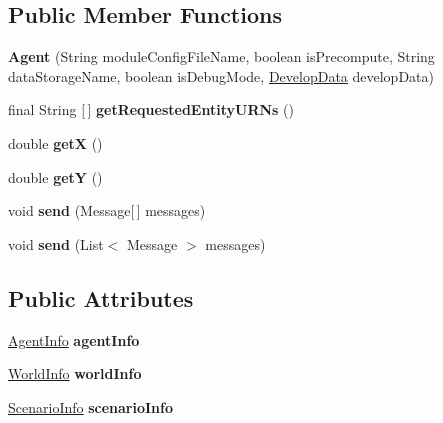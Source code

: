 \subsection*{Public Member Functions}
\begin{DoxyCompactItemize}
\item 
\hypertarget{classadf_1_1agent_1_1Agent_ababeb55c6e8dd72407db4f392b1d25e9}{}\label{classadf_1_1agent_1_1Agent_ababeb55c6e8dd72407db4f392b1d25e9} 
{\bfseries Agent} (String module\+Config\+File\+Name, boolean is\+Precompute, String data\+Storage\+Name, boolean is\+Debug\+Mode, \hyperlink{classadf_1_1agent_1_1develop_1_1DevelopData}{Develop\+Data} develop\+Data)
\item 
\hypertarget{classadf_1_1agent_1_1Agent_a39ccb85e5b206e0e521fb20d865cbefd}{}\label{classadf_1_1agent_1_1Agent_a39ccb85e5b206e0e521fb20d865cbefd} 
final String \mbox{[}$\,$\mbox{]} {\bfseries get\+Requested\+Entity\+U\+R\+Ns} ()
\item 
\hypertarget{classadf_1_1agent_1_1Agent_a09eb35626bb940da8a0b5d48ea098682}{}\label{classadf_1_1agent_1_1Agent_a09eb35626bb940da8a0b5d48ea098682} 
double {\bfseries getX} ()
\item 
\hypertarget{classadf_1_1agent_1_1Agent_a5161c268c9a7dd0382db84b7592c08f6}{}\label{classadf_1_1agent_1_1Agent_a5161c268c9a7dd0382db84b7592c08f6} 
double {\bfseries getY} ()
\item 
\hypertarget{classadf_1_1agent_1_1Agent_ac1c04c3453252af7754dff684091fdc3}{}\label{classadf_1_1agent_1_1Agent_ac1c04c3453252af7754dff684091fdc3} 
void {\bfseries send} (Message\mbox{[}$\,$\mbox{]} messages)
\item 
\hypertarget{classadf_1_1agent_1_1Agent_a4b7a389a5f8c0ae1dc60e7831de59833}{}\label{classadf_1_1agent_1_1Agent_a4b7a389a5f8c0ae1dc60e7831de59833} 
void {\bfseries send} (List$<$ Message $>$ messages)
\end{DoxyCompactItemize}
\subsection*{Public Attributes}
\begin{DoxyCompactItemize}
\item 
\hypertarget{classadf_1_1agent_1_1Agent_aa547b5cd18770b2e9bc7460eea8f03a3}{}\label{classadf_1_1agent_1_1Agent_aa547b5cd18770b2e9bc7460eea8f03a3} 
\hyperlink{classadf_1_1agent_1_1info_1_1AgentInfo}{Agent\+Info} {\bfseries agent\+Info}
\item 
\hypertarget{classadf_1_1agent_1_1Agent_a5c9c233f23eec057d6e6e415d3dc77f5}{}\label{classadf_1_1agent_1_1Agent_a5c9c233f23eec057d6e6e415d3dc77f5} 
\hyperlink{classadf_1_1agent_1_1info_1_1WorldInfo}{World\+Info} {\bfseries world\+Info}
\item 
\hypertarget{classadf_1_1agent_1_1Agent_ac2e2e8cad945673ee941e29251bddfcb}{}\label{classadf_1_1agent_1_1Agent_ac2e2e8cad945673ee941e29251bddfcb} 
\hyperlink{classadf_1_1agent_1_1info_1_1ScenarioInfo}{Scenario\+Info} {\bfseries scenario\+Info}
\end{DoxyCompactItemize}
